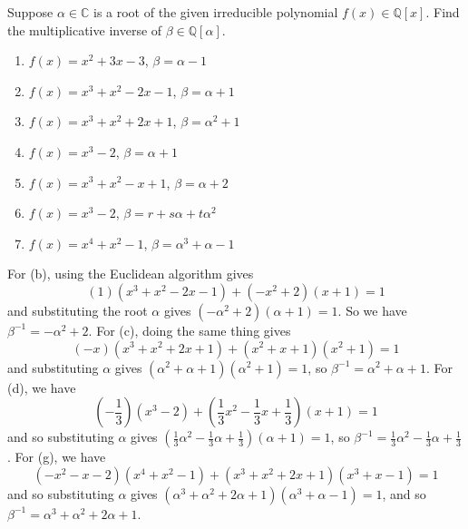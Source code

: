   \begin{exercise}[Shifrin 3.2.6.b/c/d/g]
    Suppose $\alpha \in \mathbb{C}$ is a root of the given irreducible polynomial $f(x) \in \mathbb{Q}[x]$. Find the multiplicative inverse of $\beta \in \mathbb{Q}[\alpha]$.
    \begin{enumerate}
      \item $f(x) = x^2 + 3x - 3$, $\beta = \alpha - 1$ 
      \item $f(x) = x^3 + x^2 - 2x - 1$, $\beta = \alpha + 1$
      \item $f(x) = x^3 + x^2 + 2x + 1$, $\beta = \alpha^2 + 1$
      \item $f(x) = x^3 - 2$, $\beta = \alpha + 1$
      \item $f(x) = x^3 + x^2 - x + 1$, $\beta = \alpha + 2$
      \item $f(x) = x^3 - 2$, $\beta = r + s\alpha + t\alpha^2$
      \item $f(x) = x^4 + x^2 - 1$, $\beta = \alpha^3 + \alpha - 1$
    \end{enumerate}
  \end{exercise}
  \begin{solution}
    For (b), using the Euclidean algorithm gives 
    \begin{equation}
      (1) (x^3 + x^2 - 2x - 1) + (-x^2 + 2) (x + 1) = 1 
    \end{equation}
    and substituting the root $\alpha$ gives $(-\alpha^2 + 2)(\alpha + 1) = 1$. So we have $\beta^{-1} = -\alpha^2 + 2$.  
    For (c), doing the same thing gives 
    \begin{equation}
      (-x) (x^3 + x^2 + 2x + 1) + (x^2 + x + 1)(x^2 + 1) = 1
    \end{equation}
    and substituting $\alpha$ gives $(\alpha^2 + \alpha + 1)(\alpha^2 + 1) = 1$, so $\beta^{-1} = \alpha^2 + \alpha + 1$. 
    For (d), we have 
    \begin{equation}
      (-\frac{1}{3}) (x^3 - 2) + (\frac{1}{3} x^2 - \frac{1}{3} x + \frac{1}{3}) (x + 1) = 1 
    \end{equation}
    and so substituting $\alpha$ gives $(\frac{1}{3} \alpha^2 - \frac{1}{3} \alpha + \frac{1}{3}) (\alpha + 1) = 1$, so $\beta^{-1} = \frac{1}{3} \alpha^2 - \frac{1}{3} \alpha + \frac{1}{3}$. For (g), we have 
    \begin{equation}
      (-x^2 - x - 2) (x^4 + x^2 - 1) + (x^3 + x^2 + 2x + 1) (x^3 + x - 1) = 1
    \end{equation}
    and so substituting $\alpha$ gives $(\alpha^3 + \alpha^2 + 2\alpha + 1) (\alpha^3 + \alpha - 1) = 1$, and so $\beta^{-1} = \alpha^3 + \alpha^2 + 2\alpha + 1$. 
  \end{solution}

